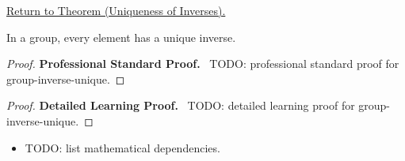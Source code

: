 \newpage
{}
\label{prf:group-inverse-unique}

\begin{remark*}[Return]
\hyperref[prop:group-inverse-unique]{Return to Theorem (Uniqueness of Inverses).}
\end{remark*}

\begin{theorem*}
In a group, every element has a unique inverse.
\end{theorem*}

\begin{proof}
\textbf{Professional Standard Proof.}~
TODO: professional standard proof for group-inverse-unique.
\end{proof}

\begin{proof}
\textbf{Detailed Learning Proof.}~
TODO: detailed learning proof for group-inverse-unique.
\end{proof}

\begin{remark*}
\end{remark*}

\begin{dependencies}
\begin{itemize}
  \item TODO: list mathematical dependencies.
\end{itemize}
\end{dependencies}

\clearpage
